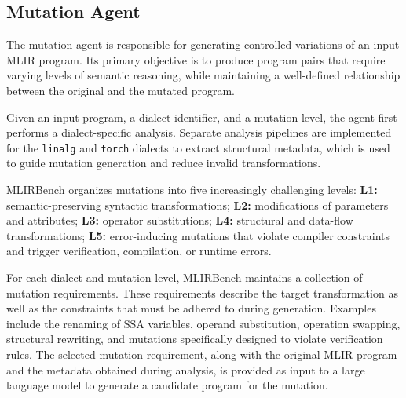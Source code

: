 \documentclass[sigplan,screen,review,anonymous]{acmart}
\providecommand{\DIFdelend}{} %
\begin{document}



\DIFdelend \subsection{Mutation Agent}

The mutation agent is responsible for generating controlled variations of an input MLIR program. Its primary objective is to produce program pairs that require varying levels of semantic reasoning, while maintaining a well-defined relationship between the original and the mutated program.

Given an input program, a dialect identifier, and a mutation level, the agent first performs a dialect-specific analysis. Separate analysis pipelines are implemented for the \texttt{linalg} and \texttt{torch} dialects to extract structural metadata, which is used to guide mutation generation and reduce invalid transformations.

MLIRBench organizes mutations into five increasingly challenging levels:
\textbf{L1:} semantic-preserving syntactic transformations;
\textbf{L2:} modifications of parameters and attributes;
\textbf{L3:} operator substitutions;
\textbf{L4:} structural and data-flow transformations;
\textbf{L5:} error-inducing mutations that violate compiler constraints and trigger verification, compilation, or runtime errors.

For each dialect and mutation level, MLIRBench maintains a collection of mutation requirements. These requirements describe the target transformation as well as the constraints that must be adhered to during generation. Examples include the renaming of SSA variables, operand substitution, operation swapping, structural rewriting, and mutations specifically designed to violate verification rules. The selected mutation requirement, along with the original MLIR program and the metadata obtained during analysis, is provided as input to a large language model to generate a candidate program for the mutation.
\end{document}
